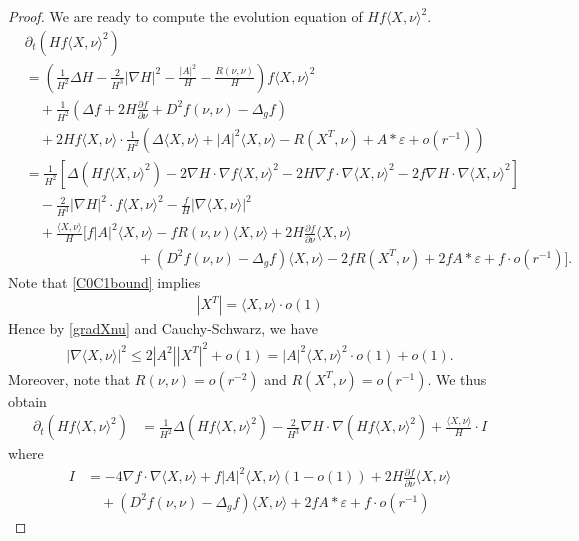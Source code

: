 \documentclass[12pt,twoside]{article}
\theoremstyle{plain}
\theoremstyle{definition}
\theoremstyle{remark}
\newcommand{\pl}{\partial}
\newcommand{\na}{\nabla}
\newcommand{\lt}{\left}
\newcommand{\rt}{\right}
\numberwithin{equation}{section}
\begin{document}
\begin{proof}
We are ready to compute the evolution equation of $H f \langle X,\nu \rangle^2$.
\begin{align*}
&\pl_t \lt( H f \langle X,\nu \rangle^2 \rt) \\
&= \lt( \frac{1}{H^2}\Delta H - \frac{2}{H^3} |\na H|^2 - \frac{|A|^2}{H} - \frac{R(\nu,\nu)}{H} \rt) f \langle X,\nu\rangle^2 \\
&\quad + \frac{1}{H^2} \lt(\Delta f +  2H \frac{\pl f}{\pl\nu} + D^2 f(\nu,\nu) - \Delta_g f \rt) \\
&\quad + 2 H f \langle X,\nu \rangle \cdot \frac{1}{H^2} \lt( \Delta \langle X,\nu \rangle + |A|^2 \langle X,\nu \rangle - R(X^T,\nu) + A * \varepsilon + o(r^{-1}) \rt)\\
&= \frac{1}{H^2} \lt[ \Delta (H f \langle X,\nu \rangle^2) - 2 \na H \cdot \na f \langle X,\nu \rangle^2 - 2 H \na f \cdot \na \langle X,\nu \rangle^2 - 2 f \na H \cdot \na\langle X,\nu \rangle^2 \rt] \\
&\quad - \frac{2}{H^3} |\na H|^2 \cdot f \langle X,\nu \rangle^2 - \frac{f}{H} |\na \langle X,\nu \rangle|^2  \\
&\quad + \frac{\langle X,\nu \rangle}{H} \Big[  f |A|^2 \langle X,\nu \rangle - f R(\nu,\nu) \langle X,\nu \rangle + 2 H \frac{\pl f}{\pl\nu} \langle X,\nu \rangle \\
&\qquad\qquad\qquad\qquad + (D^2 f(\nu,\nu) - \Delta_g f)\langle X,\nu \rangle - 2f R(X^T,\nu) + 2f A * \varepsilon + f \cdot o(r^{-1}) \Big].
\end{align*}
Note that \eqref{C0C1bound} implies 
\begin{align*}
|X^T| = \langle X,\nu \rangle \cdot o(1)
\end{align*} Hence by \eqref{gradXnu} and Cauchy-Schwarz, we have \begin{align*}
|\na\langle X,\nu \rangle|^2  \le 2 |A^2| |X^T|^2 + o(1) = |A|^2 \langle X,\nu \rangle^2 \cdot o(1) + o(1).
\end{align*}
Moreover, note that $R(\nu,\nu) = o(r^{-2})$ and $R(X^T,\nu) = o(r^{-1})$. We thus obtain
\begin{align*}
\pl_t \lt( Hf\langle X,\nu \rangle^2 \rt) &= \frac{1}{H^2}\Delta (Hf\langle X,\nu \rangle^2) - \frac{2}{H^3} \na H \cdot \na (Hf\langle X,\nu \rangle^2) + \frac{\langle X,\nu\rangle}{H} \cdot I
\end{align*}
where
\begin{align*}
I &= -4 \na f \cdot \na\langle X,\nu \rangle + f |A|^2 \langle X,\nu \rangle (1 - o(1)) + 2H \frac{\pl f}{\pl\nu} \langle X,\nu \rangle \\
&\quad +(D^2 f(\nu,\nu) - \Delta_g f)\langle X,\nu \rangle + 2f A * \varepsilon + f \cdot o(r^{-1})
\end{align*}


\end{proof}
\end{document}
